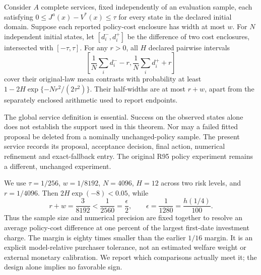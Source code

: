 \begin{theorem}\label{thm:power96}
Consider $A$ complete services, fixed independently of an evaluation sample, each satisfying
$0\leq J^a(x)-V^*(x)\leq\tau$ for every state in the declared initial domain. Suppose each reported policy-cost enclosure has width at most $w$. For $N$ independent initial states, let $[d_i^-,d_i^+]$ be the difference of two cost enclosures, intersected with $[-\tau,\tau]$. For any $r>0$, all $H$ declared pairwise intervals
\begin{equation}\label{eq:paired96}
 \left[\frac1N\sum_i d_i^- -r,
       \frac1N\sum_i d_i^+ +r\right]
\end{equation}
cover their original-law mean contrasts with probability at least
$1-2H\exp\{-Nr^2/(2\tau^2)\}$. Their half-widths are at most $r+w$, apart from the separately enclosed arithmetic used to report endpoints.
\end{theorem}

The global service definition is essential. Success on the observed states alone does not establish the support used in this theorem. Nor may a failed fitted proposal be deleted from a nominally unchanged-policy sample. The present service records its proposal, acceptance decision, final action, numerical refinement and exact-fallback entry. The original R95 policy experiment remains a different, unchanged experiment.

We use $\tau=1/256$, $w=1/8192$, $N=4096$, $H=12$ across two risk levels, and $r=1/4096$. Then $2H\exp(-8)<0.05$, while
\begin{equation}\label{eq:power96}
 r+w=\frac3{8192}<\frac1{2560}=\frac{\epsilon}{2},
 \qquad \epsilon=\frac1{1280}=\frac{h(1/4)}{100}.
\end{equation}
Thus the sample size and numerical precision are fixed together to resolve an average policy-cost difference at one percent of the largest first-date investment charge. The margin is eighty times smaller than the earlier $1/16$ margin. It is an explicit model-relative purchaser tolerance, not an estimated welfare weight or external monetary calibration. We report which comparisons actually meet it; the design alone implies no favorable sign.

